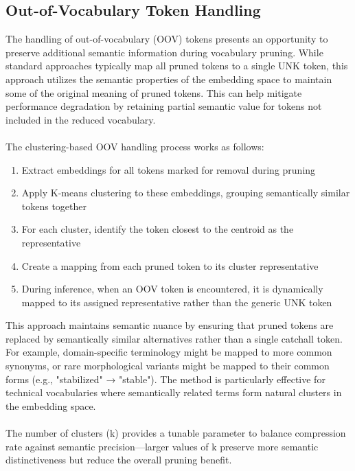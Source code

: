 \documentclass[twocolumn]{article}
\begin{document}
\subsection{Out-of-Vocabulary Token Handling}
The handling of out-of-vocabulary (OOV) tokens presents an opportunity to preserve additional semantic information during vocabulary pruning. While standard approaches typically map all pruned tokens to a single UNK token, this approach utilizes the semantic properties of the embedding space to maintain some of the original meaning of pruned tokens. This can help mitigate performance degradation by retaining partial semantic value for tokens not included in the reduced vocabulary.
\\ \\
The clustering-based OOV handling process works as follows:
\begin{enumerate}
    \item Extract embeddings for all tokens marked for removal during pruning
    \item Apply K-means clustering to these embeddings, grouping semantically similar tokens together
    \item For each cluster, identify the token closest to the centroid as the representative
    \item Create a mapping from each pruned token to its cluster representative
    \item During inference, when an OOV token is encountered, it is dynamically mapped to its assigned representative rather than the generic UNK token
\end{enumerate}
This approach maintains semantic nuance by ensuring that pruned tokens are replaced by semantically similar alternatives rather than a single catchall token. For example, domain-specific terminology might be mapped to more common synonyms, or rare morphological variants might be mapped to their common forms (e.g., "stabilized" → "stable"). The method is particularly effective for technical vocabularies where semantically related terms form natural clusters in the embedding space.
\\ \\
The number of clusters (k) provides a tunable parameter to balance compression rate against semantic precision—larger values of k preserve more semantic distinctiveness but reduce the overall pruning benefit. 
\end{document}
